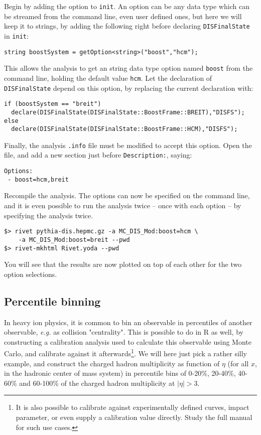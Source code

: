 \documentclass[11pt]{article}
\def\eg{\emph{e.g.}\xspace}
\newcommand{\rivet}{R\protect\scalebox{0.8}{IVET}\xspace}
\begin{document}
Begin by adding the option to \texttt{init}. An option can be any data type which can be streamed from the command line, even user defined ones, but here we will keep it to strings, by adding the following right before declaring \texttt{DISFinalState} in \texttt{init}:

\begin{verbatim}
string boostSystem = getOption<string>("boost","hcm");
\end{verbatim}

This allows the analysis to get an string data type option named \texttt{boost} from the command line, holding the default value \texttt{hcm}. Let the declaration of \texttt{DISFinalState} depend on this option, by replacing the current declaration with:

\begin{verbatim}
if (boostSystem == "breit")
  declare(DISFinalState(DISFinalState::BoostFrame::BREIT),"DISFS");
else
  declare(DISFinalState(DISFinalState::BoostFrame::HCM),"DISFS");
\end{verbatim}

Finally, the analysis \texttt{.info} file must be modified to accept this option. Open the file, and add a new section just before \texttt{Description:}, saying:

\begin{verbatim}
Options:
 - boost=hcm,breit
\end{verbatim}
Recompile the analysis. The options can now be specified on the command line, and it is even possible to run the analysis twice -- once with each option -- by specifying the analysis twice.

\begin{verbatim}
$> rivet pythia-dis.hepmc.gz -a MC_DIS_Mod:boost=hcm \
    -a MC_DIS_Mod:boost=breit --pwd
$> rivet-mkhtml Rivet.yoda --pwd
\end{verbatim}
You will see that the results are now plotted on top of each other for the two option selections.

\subsection{Percentile binning}
In heavy ion physics, it is common to bin an observable in percentiles of another observable, \eg as collision "centrality". This is possible to do in \rivet as well, by constructing a calibration analysis used to calculate this observable using Monte Carlo, and calibrate against it afterwards\footnote{It is also possible to calibrate against experimentally defined curves, impact parameter, or even supply a calibration value directly. Study the full manual for such use cases.}. We will here just pick a rather silly example, and construct the charged hadron multiplicity as function of $\eta$ (for all $x$, in the hadronic center of mass system) in percentile bins of 0-20\%, 20-40\%, 40-60\% and 60-100\% of the charged hadron multiplicity at $|\eta| > 3$.
\end{document}
